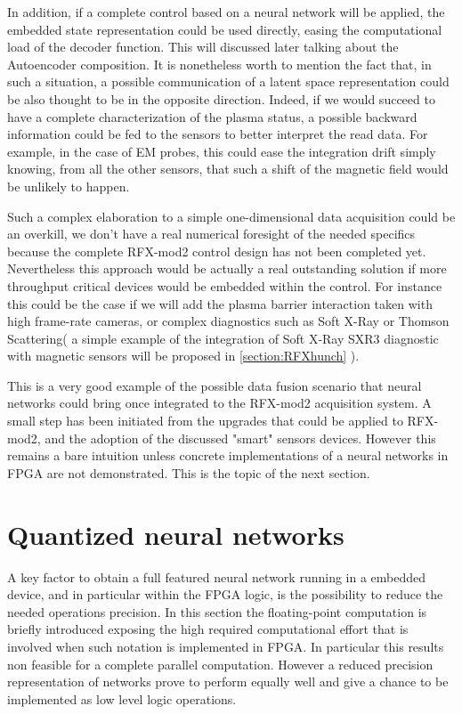 In addition, if a complete control based on a neural network will be applied, the embedded state representation could be used directly, easing the computational load of the decoder function. This will discussed later talking about the Autoencoder composition.
It is nonetheless worth to mention the fact that, in such a situation, a possible communication of a latent space representation could be also thought to be in the opposite direction. Indeed, if we would succeed to have a complete characterization of the plasma status, a possible backward information could be fed to the sensors to better interpret the read data.
For example, in the case of EM probes, this could ease the integration drift simply knowing, from all the other sensors, that such a shift of the magnetic field would be unlikely to happen.

Such a complex elaboration to a simple one-dimensional data acquisition could be an overkill, we don't have a real numerical foresight of the needed specifics because the complete RFX-mod2 control design has not been completed yet.
Nevertheless this approach would be actually a real outstanding solution if more throughput critical devices would be embedded within the control. For instance this could be the case if we will add the plasma barrier interaction taken with high frame-rate cameras, or complex diagnostics such as Soft X-Ray or Thomson Scattering( a simple example of the integration of Soft X-Ray SXR3 diagnostic with magnetic sensors will be proposed in \cref{section:RFXhunch} ).

This is a very good example of the possible data fusion scenario that neural networks could bring once integrated to the RFX-mod2 acquisition system.
A small step has been initiated from the upgrades that could be applied to RFX-mod2, and the adoption of the discussed "smart" sensors devices.
However this remains a bare intuition unless concrete implementations of a neural networks in FPGA are not demonstrated.
This is the topic of the next section.








%
\section{Quantized neural networks}
\label{section:quantum}

A key factor to obtain a full featured neural network running in a embedded device, and in particular within the FPGA logic, is the possibility to reduce the needed operations precision. In this section the floating-point computation is briefly introduced exposing the high required computational effort that is involved when such notation is implemented in FPGA. In particular this results non feasible for a complete parallel computation. However a reduced precision representation of networks prove to perform equally well and give a chance to be implemented as low level logic operations.

